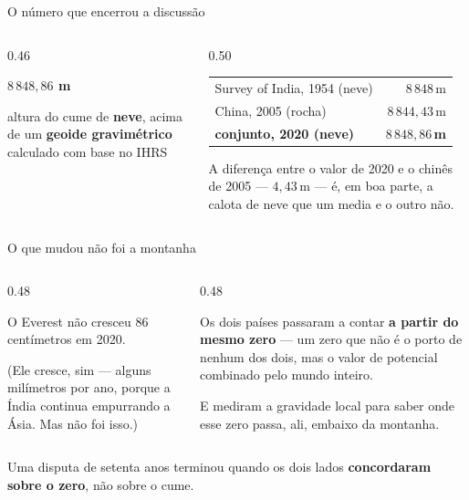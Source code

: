 \documentclass[aspectratio=169,11pt]{beamer}
\newcommand{\bnum}[1]{\textbf{\textcolor{mTeal}{#1}}}
\begin{document}
\begin{frame}{O número que encerrou a discussão}
  \begin{columns}[c]
    \begin{column}{0.46\textwidth}
      \begin{ideia}[title={Everest --- valor oficial desde 08/12/2020}]
        \centering
        {\Large \bnum{$8\,848{,}86$ m}}
        \medskip

        altura do cume de \textbf{neve}, acima de um \textbf{geoide gravimétrico}
        calculado \alert{com base no IHRS}
      \end{ideia}
    \end{column}
    \begin{column}{0.50\textwidth}
      \centering
      \small
      \renewcommand{\arraystretch}{1.25}
      \begin{tabular}{lr}
        \toprule
        Survey of India, 1954 (neve) & $8\,848$\,m \\
        China, 2005 (rocha) & $8\,844{,}43$\,m \\
        \midrule
        \textbf{conjunto, 2020 (neve)} & \bnum{$8\,848{,}86$\,m} \\
        \bottomrule
      \end{tabular}
      \medskip

      {\small A diferença entre o valor de 2020 e o chinês de 2005 --- $4{,}43$\,m ---
      é, em boa parte, a \textcolor{corAgua}{calota de neve} que um media e o outro não.}
    \end{column}
  \end{columns}
\end{frame}

\begin{frame}{O que mudou não foi a montanha}
  \begin{columns}[T]
    \begin{column}{0.48\textwidth}
      \begin{armadilha}[title={O que NÃO aconteceu}]
        O Everest não cresceu $86$ centímetros em 2020.
        \medskip

        (Ele cresce, sim --- alguns milímetros por ano, porque a Índia continua empurrando
        a Ásia. Mas não foi isso.)
      \end{armadilha}
    \end{column}
    \begin{column}{0.48\textwidth}
      \begin{ideia}[title={O que aconteceu}]
        Os dois países passaram a contar \bnum{a partir do mesmo zero} --- um zero que não
        é o porto de nenhum dos dois, mas o valor de potencial combinado pelo mundo
        inteiro.
        \medskip

        E mediram a gravidade local para saber onde esse zero passa, ali, embaixo da
        montanha.
      \end{ideia}
    \end{column}
  \end{columns}
  \bigskip
  \centering
  Uma disputa de setenta anos terminou quando os dois lados \bnum{concordaram sobre o
  zero}, não sobre o cume.
\end{frame}
\end{document}
